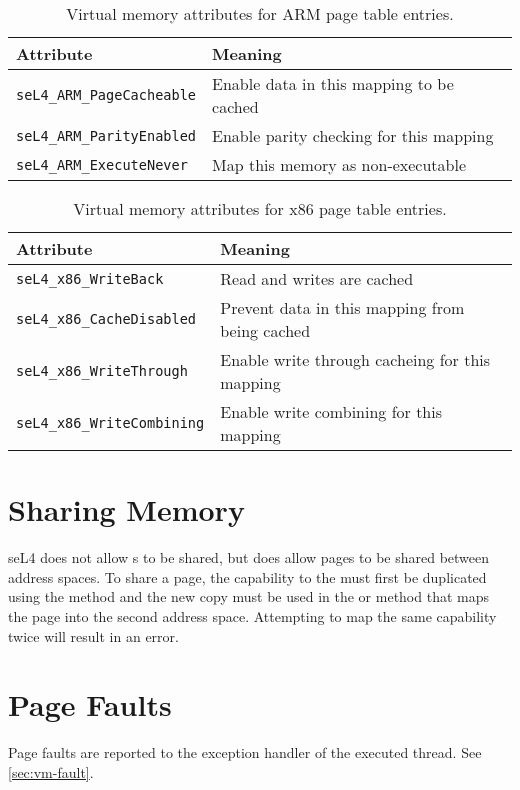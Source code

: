 \begin{table}[htb]
  \begin{center}
    \begin{tabularx}{\textwidth}{p{}X}
      \toprule
      Attribute & Meaning \\
      \midrule
      \texttt{seL4\_ARM\_PageCacheable} & Enable data in this mapping
      to be cached \\
      \texttt{seL4\_ARM\_ParityEnabled} & Enable parity checking for
      this mapping\\
      \texttt{seL4\_ARM\_ExecuteNever} & Map this memory as non-executable \\
      \bottomrule
    \end{tabularx}
    \caption{\label{tbl:vmattr_arm} Virtual memory attributes for ARM page
      table entries.}
  \end{center}
\end{table}

\begin{table}[htb]
  \begin{center}
    \begin{tabularx}{\textwidth}{p{}X}
      \toprule
      Attribute & Meaning \\
      \midrule
      \texttt{seL4\_x86\_WriteBack} & Read and writes are cached \\
      \texttt{seL4\_x86\_CacheDisabled} & Prevent data in this mapping
      from being cached \\
      \texttt{seL4\_x86\_WriteThrough} & Enable write through cacheing for this mapping \\
      \texttt{seL4\_x86\_WriteCombining} & Enable write combining for this mapping \\
      \bottomrule
    \end{tabularx}
    \caption{\label{tbl:vmattr_ia32} Virtual memory attributes for x86 page
      table entries.}
  \end{center}
\end{table}

\section{Sharing Memory}

seL4 does not allow s to be shared, but does allow
pages to be shared between address spaces. 
To share a page, the capability to the 
 must first be
duplicated using the  method and the new copy must
be used in the  \ifxeightsix or  \fi method that maps the page into the second
address space. Attempting to map the same capability
twice will result in an error. 


\section{Page Faults}

Page faults are reported to the exception handler of the executed thread.
See \autoref{sec:vm-fault}.

